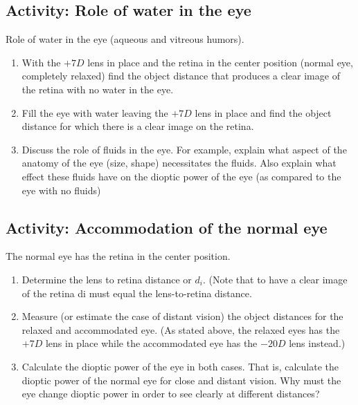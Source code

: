 \subsection{Activity: Role of water in the eye}
Role of water in the eye (aqueous and vitreous humors).
\begin{enumerate}
	\item With the $+7D$ lens in place and the retina in the center position (normal eye, completely relaxed) find the object distance that produces a clear image of the retina with no water in the eye.
	\item Fill the eye with water leaving the $+7D$ lens in place and find the object distance for which there is a clear image on the retina.
	\item Discuss the role of fluids in the eye. For example, explain what aspect of the anatomy of the eye (size, shape) necessitates the fluids. Also explain what effect these fluids have on the dioptic power of the eye (as compared to the eye with no fluids)
\end{enumerate}

\subsection{Activity: Accommodation of the normal eye}
The normal eye has the retina in the center position.
\begin{enumerate}
	\item Determine the lens to retina distance or $d_i$. (Note that to have a clear image of the retina di must equal the lens-to-retina distance.
	\item Measure (or estimate the case of distant vision) the object distances for the relaxed and accommodated eye. (As stated above, the relaxed eyes has the $+7 D$ lens in place while the accommodated eye has the $-20 D$ lens instead.)
	\item Calculate the dioptic power of the eye in both cases. That is, calculate the dioptic power of the normal eye for close and distant vision.
Why must the eye change dioptic power in order to see clearly at different distances?
\end{enumerate}

